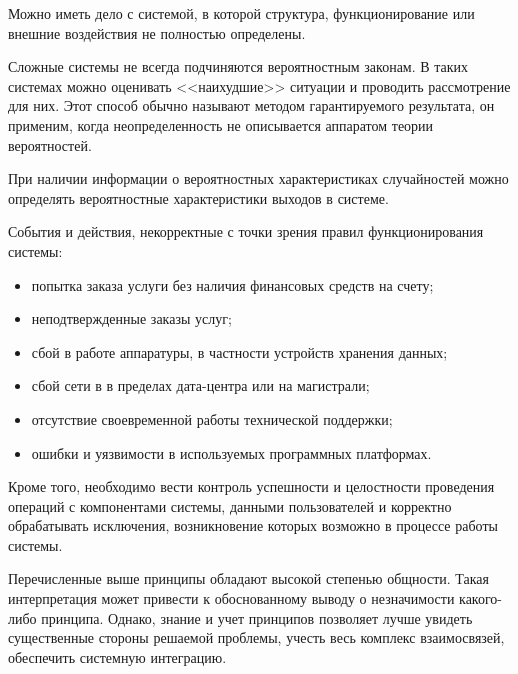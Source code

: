 Можно иметь дело с системой, в которой структура, функционирование или внешние воздействия не полностью определены.

Сложные системы не всегда подчиняются вероятностным законам.
В таких системах можно оценивать <<наихудшие>> ситуации и проводить рассмотрение для них.
Этот способ обычно называют методом гарантируемого результата, он применим, когда неопределенность не описывается аппаратом теории вероятностей.

При наличии информации о вероятностных характеристиках случайностей можно определять вероятностные характеристики выходов в системе.

События и действия, некорректные с точки зрения правил функционирования системы:
\begin{itemize}
  \item попытка заказа услуги без наличия финансовых средств на счету;
  \item неподтвержденные заказы услуг;
  \item сбой в работе аппаратуры, в частности устройств хранения данных;
  \item сбой сети в в пределах дата-центра или на магистрали;
  \item отсутствие своевременной работы технической поддержки;
  \item ошибки и уязвимости в используемых программных платформах.
\end{itemize}

Кроме того, необходимо вести контроль успешности и целостности проведения операций с компонентами системы, данными пользователей и корректно обрабатывать исключения, возникновение которых возможно в процессе работы системы.

Перечисленные выше принципы обладают высокой степенью общности.
Такая интерпретация может привести к обоснованному выводу о незначимости какого-либо принципа.
Однако, знание и учет принципов позволяет лучше увидеть существенные стороны решаемой проблемы, учесть весь комплекс взаимосвязей, обеспечить системную интеграцию.

\clearpage
